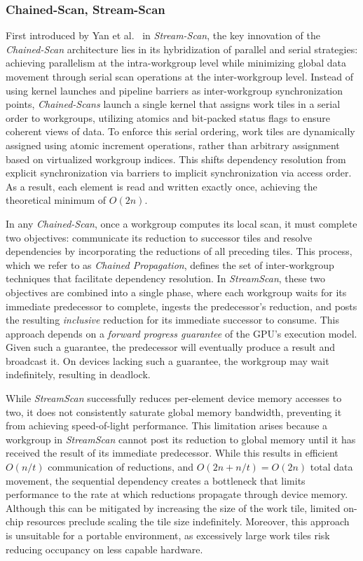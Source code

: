 \documentclass[sigconf]{acmart}
\begin{document}
\subsubsection{Chained-Scan, Stream-Scan}
First introduced by Yan et al.~\cite{10.1145/2442516.2442539} in \emph{Stream-Scan}, the key innovation of the \emph{Chained-Scan} architecture lies in its hybridization of parallel and serial strategies: achieving parallelism at the intra-workgroup level while minimizing global data movement through serial scan operations at the inter-workgroup level. Instead of using kernel launches and pipeline barriers as inter-workgroup synchronization points, \emph{Chained-Scans} launch a single kernel that assigns work tiles in a serial order to workgroups, utilizing atomics and bit-packed status flags to ensure coherent views of data. To enforce this serial ordering, work tiles are dynamically assigned using atomic increment operations, rather than arbitrary assignment based on virtualized workgroup indices. This shifts dependency resolution from explicit synchronization via barriers to implicit synchronization via access order. As a result, each element is read and written exactly once, achieving the theoretical minimum of $O(2n)$.

In any \emph{Chained-Scan}, once a workgroup computes its local scan, it must complete two objectives: communicate its reduction to successor tiles and resolve dependencies by incorporating the reductions of all preceding tiles. This process, which we refer to as \emph{Chained Propagation}, defines the set of inter-workgroup techniques that facilitate dependency resolution. In \emph{StreamScan}, these two objectives are combined into a single phase, where each workgroup waits for its immediate predecessor to complete, ingests the predecessor's reduction, and posts the resulting \emph{inclusive} reduction for its immediate successor to consume. This approach depends on a \emph{forward progress guarantee} of the GPU's execution model. Given such a guarantee, the predecessor will eventually produce a result and broadcast it. On devices lacking such a guarantee, the workgroup may wait indefinitely, resulting in deadlock.

While \emph{StreamScan} successfully reduces per-element device memory accesses to two, it does not consistently saturate global memory bandwidth, preventing it from achieving speed-of-light performance. This limitation arises because a workgroup in \emph{StreamScan} cannot post its reduction to global memory until it has received the result of its immediate predecessor. While this results in efficient $O(n/t)$ communication of reductions, and $O(2n+ n/t)= O(2n)$ total data movement, the sequential dependency creates a bottleneck that limits performance to the rate at which reductions propagate through device memory. Although this can be mitigated by increasing the size of the work tile, limited on-chip resources preclude scaling the tile size indefinitely. Moreover, this approach is unsuitable for a portable environment, as excessively large work tiles risk reducing occupancy on less capable hardware.
\end{document}
